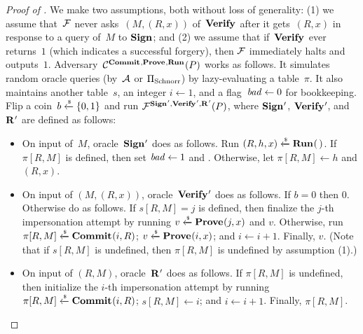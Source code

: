 \documentclass{article}
\theoremstyle{remark}
\begin{document}
\begin{proof}[Proof of ]
  We make two assumptions, both without loss of generality: (1) we assume
  that~$\mathcal{F}$ never asks~$(M, (R,x))$ of~$\textup{\textbf{Verify}}\hspace{0.5pt}$ after it gets~$(R,x)$ in
  response to a query of~$M$ to $\textup{\textbf{Sign}}\hspace{0.5pt}$; and (2) we assume that if~$\textup{\textbf{Verify}}\hspace{0.5pt}$
  ever returns~$1$ (which indicates a successful forgery), then $\mathcal{F}$ immediately
  halts and outputs~$1$.
  Adversary~$\mathcal{C}^{\textup{\textbf{Commit}}\hspace{0.5pt},\textup{\textbf{Prove}}\hspace{0.5pt},\textup{\textbf{Run}}\hspace{0.5pt}}(P)$ works as follows. It simulates
  random oracle queries (by~$\mathcal{A}$ or ${\Pi_{\mathrm{Schnorr}}}$) by lazy-evaluating
  a table~$\pi$. It also maintains another table~$s$, an integer $i\gets1$, and a
  flag~$\mathit{bad}\gets0$ for bookkeeping.
  Flip a coin~$b\xleftarrow{\text{\tiny{\$}}}\{0,1\}$ and run $\mathcal{F}^{\textup{\textbf{Sign}}\hspace{0.5pt}',\textup{\textbf{Verify}}\hspace{0.5pt}',\textup{\textbf{R}}\hspace{0.5pt}'}(P)$, where
  $\textup{\textbf{Sign}}\hspace{0.5pt}'$, $\textup{\textbf{Verify}}\hspace{0.5pt}'$, and $\textup{\textbf{R}}\hspace{0.5pt}'$ are defined as follows:
  \begin{itemize}
    \item On input of~$M$, oracle~$\textup{\textbf{Sign}}\hspace{0.5pt}'$ does as follows.  Run $(R, h, x)
      \xleftarrow{\text{\tiny{\$}}} \textup{\textbf{Run}}\hspace{0.5pt}(\,)$. If $\pi[R,M]$ is defined, then set $\mathit{bad}\gets1$ and
      . Otherwise, let $\pi[R,M]\gets h$ and \rreturn $(R, x)$.

    \item On input of $(M, (R,x))$, oracle~$\textup{\textbf{Verify}}\hspace{0.5pt}'$ does as follows. If $b=0$
      then \rreturn $0$. Otherwise do as follows. If $s[R,M]=j$ is defined, then
      finalize the $j$-th impersonation attempt by running $v \xleftarrow{\text{\tiny{\$}}}
      \textup{\textbf{Prove}}\hspace{0.5pt}(j,x)$ and \rreturn $v$. Otherwise, run
      $\pi[R,M]\xleftarrow{\text{\tiny{\$}}}\textup{\textbf{Commit}}\hspace{0.5pt}(i,R)$; $v \xleftarrow{\text{\tiny{\$}}} \textup{\textbf{Prove}}\hspace{0.5pt}(i,x)$; and $i \gets i +
      1$. Finally, \rreturn $v$.
      (Note that if $s[R,M]$ is undefined, then $\pi[R,M]$ is undefined
      by assumption (1).)

    \item On input of $(R, M)$, oracle~$\textup{\textbf{R}}\hspace{0.5pt}'$ does as follows.
      If $\pi[R,M]$ is undefined, then initialize the $i$-th impersonation attempt
      by running $\pi[R,M]\xleftarrow{\text{\tiny{\$}}}\textup{\textbf{Commit}}\hspace{0.5pt}(i,R)$; $s[R,M]\gets i$; and $i\gets i
      + 1$. Finally, \rreturn $\pi[R,M]$.
  \end{itemize}


\end{proof}
\end{document}
